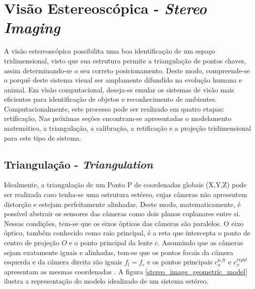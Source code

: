 \chapter{Visão Estereoscópica - \textit{Stereo Imaging}}
\label{Revisão Bibliográfica}


A visão estereoscópica possibilita uma boa identificação de um espaço tridimensional, visto que sua estrutura permite a triangulação de pontos chaves, assim determinando-se o seu correto posicionamento. Deste modo, compreende-se o porquê deste sistema visual ser amplamente difundido na evolução humana e animal. Em visão computacional, deseja-se emular os sistemas de visão mais eficientes para identificação de objetos e reconhecimento de ambientes. Computacionalmente, este processo pode ser realizado em quatro etapas: retificação,  Nas próximas seções encontram-se apresentadas o modelamento matemático, a triangulação, a calibração, a retificação e a projeção tridimensional para este tipo de sistema. 

\section{Triangulação - \textit{Triangulation}}

Idealmente, a triangulação de um Ponto P de coordenadas globais (X,Y,Z) pode ser realizada caso tenha-se uma estrutura estéreo, cujas câmeras não apresentem distorção e estejam perfeitamente alinhadas. Deste modo, matematicamente, é possível abstrair os sensores das câmeras como dois planos coplanares entre si. Nessas condições, tem-se que os eixos ópticos das câmeras são paralelos. O eixo óptico, também conhecido como raio principal, é a reta que intercepta o ponto de centro de projeção ${O}$ e o ponto principal da lente ${c}$. Assumindo que as câmeras sejam exatamente iguais e alinhadas, tem-se que os pontos focais da câmera esquerda e da câmera direita são iguais ${f_l = f_r}$ e os pontos principais ${c^{left}_x}$ e  ${c^{right}_x}$ apresentam as mesmas coordenadas \cite{Bradski2008}. A figura \ref{stereo_image_geometric_model} ilustra a representação do modelo idealizado de um sistema estéreo.


